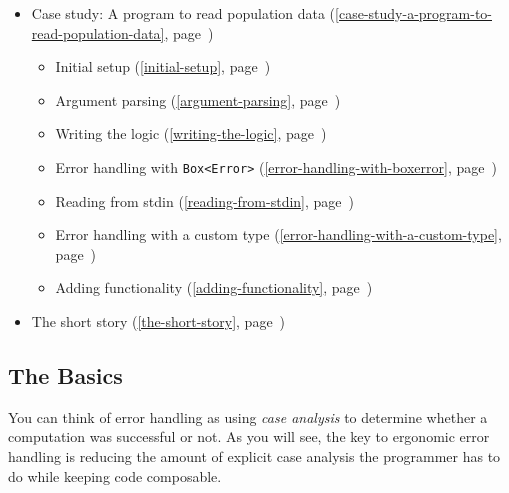 \documentclass[a4paper,]{book}
\renewcommand*{\hypertarget}[3][\ar]{%
  \def\ar{#2}%
  \label{#1}%
  #3}
\renewcommand*{\hyperlink}[2]{%
 #2 (\autoref{#1}, page~\pageref{#1})}
\providecommand{\tightlist}{%
  \setlength{\itemsep}{0pt}\setlength{\parskip}{0pt}}
\begin{document}
\begin{itemize}
  \begin{itemize}
  \tightlist
  \item
    \protect\hyperlink{the-error-trait}{The \texttt{Error} trait}
  \item
    \protect\hyperlink{the-from-trait}{The \texttt{From} trait}
  \item
    \protect\hyperlink{the-real-try-macro}{The real \texttt{try!} macro}
  \item
    \protect\hyperlink{composing-custom-error-types}{Composing custom
    error types}
  \item
    \protect\hyperlink{advice-for-library-writers}{Advice for library
    writers}
  \end{itemize}
\item
  \protect\hyperlink{case-study-a-program-to-read-population-data}{Case
  study: A program to read population data}

  \begin{itemize}
  \tightlist
  \item
    \protect\hyperlink{initial-setup}{Initial setup}
  \item
    \protect\hyperlink{argument-parsing}{Argument parsing}
  \item
    \protect\hyperlink{writing-the-logic}{Writing the logic}
  \item
    \protect\hyperlink{error-handling-with-boxerror}{Error handling with
    \texttt{Box\textless{}Error\textgreater{}}}
  \item
    \protect\hyperlink{reading-from-stdin}{Reading from stdin}
  \item
    \protect\hyperlink{error-handling-with-a-custom-type}{Error handling
    with a custom type}
  \item
    \protect\hyperlink{adding-functionality}{Adding functionality}
  \end{itemize}
\item
  \protect\hyperlink{the-short-story}{The short story}
\end{itemize}

\hypertarget{the-basics}{\subsection{The Basics}\label{the-basics}}

You can think of error handling as using \emph{case analysis} to
determine whether a computation was successful or not. As you will see,
the key to ergonomic error handling is reducing the amount of explicit
case analysis the programmer has to do while keeping code composable.
\end{document}
